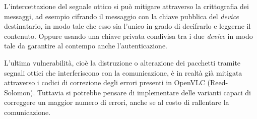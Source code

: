 L'intercettazione del segnale ottico si può mitigare attraverso la crittografia dei messaggi, ad esempio cifrando il messaggio con la chiave pubblica del \textit{device} destinatario, in modo tale che esso sia l'unico in grado di decifrarlo e leggerne il contenuto. Oppure usando una chiave privata condivisa tra i due \textit{device} in modo tale da garantire al contempo anche l'autenticazione.

L'ultima vulnerabilità, cioè la distruzione o alterazione dei pacchetti tramite segnali ottici che interferiscono con la comunicazione, è in realtà già mitigata attraverso i codici di correzione degli errori presenti in OpenVLC (Reed-Solomon). Tuttavia si potrebbe pensare di implementare delle varianti capaci di correggere un maggior numero di errori, anche se al costo di rallentare la comunicazione.

